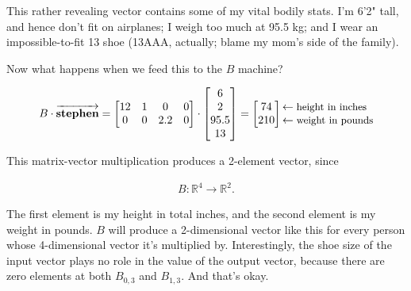 This rather revealing vector contains some of my vital bodily stats. I'm 6'2"
tall, and hence don't fit on airplanes; I weigh too much at 95.5 kg; and I wear
an impossible-to-fit 13 shoe (13AAA, actually; blame my mom's side of the
family).

Now what happens when we feed this to the $B$ machine?

\vspace{-.15in}
\begin{align*}
B \cdot \overrightarrow{\textbf{stephen}} =
\begin{bmatrix}
12 & 1 & 0 & 0 \\
0 & 0 & 2.2 & 0 \\
\end{bmatrix} \cdot
\begin{bmatrix}
6 \\ 2 \\ 95.5 \\ 13 \\
\end{bmatrix} =
\begin{bmatrix}
74 \\ 210 \\
\end{bmatrix}
\begin{matrix*}[l]
\leftarrow \textrm{\small{height in inches}} \\
\leftarrow \textrm{\small{weight in pounds}} \\
\end{matrix*}
\end{align*}
\vspace{-.15in}

This matrix-vector multiplication produces a 2-element vector, since

\vspace{-.15in}
\begin{align*}
B : \mathbb{R}^4 \rightarrow \mathbb{R}^2.
\end{align*}
\vspace{-.15in}

The first element is my height in total inches, and the second element is my
weight in pounds. $B$ will produce a 2-dimensional vector like this for every
person whose 4-dimensional vector it's multiplied by. Interestingly, the shoe
size of the input vector plays no role in the value of the output vector,
because there are zero elements at both $B_{0,3}$ and $B_{1,3}$. And that's
okay.

\smallskip
{}

